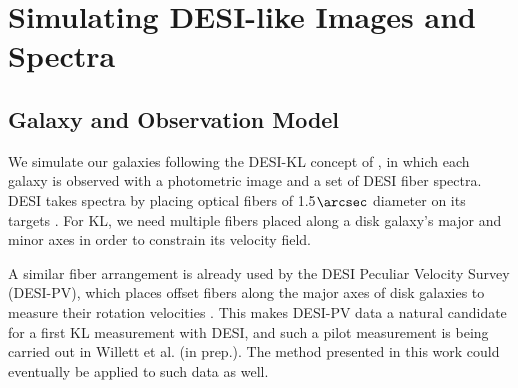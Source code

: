\section{Simulating DESI-like Images and Spectra}
\label{sec:data-generate}

\subsection{Galaxy and Observation Model}
\label{ssec:kl-model}

We simulate our galaxies following the DESI-KL concept of \citep{KLDESI}, in which each galaxy is observed with a photometric image and a set of DESI fiber spectra. DESI takes spectra by placing optical fibers of 1.5$\arcsec$ diameter on its targets \citep{DESIOverview}. For KL, we need multiple fibers placed along a disk galaxy's major and minor axes in order to constrain its velocity field.

A similar fiber arrangement is already used by the DESI Peculiar Velocity Survey (DESI-PV), which places offset fibers along the major axes of disk galaxies to measure their rotation velocities \citep{DESIPVTargetSel2023, DESIPVTF2025}. This makes DESI-PV data a natural candidate for a first KL measurement with DESI, and such a pilot measurement is being carried out in Willett et al. (in prep.). The method presented in this work could eventually be applied to such data as well.

